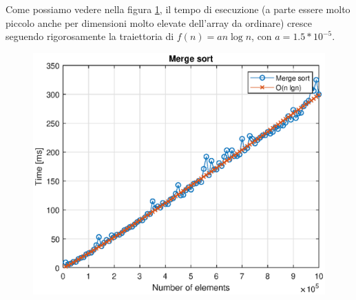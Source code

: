 Come possiamo vedere nella figura \ref{merge:fig}, il tempo di esecuzione (a parte essere molto piccolo anche per dimensioni molto elevate dell'array da ordinare) cresce seguendo rigorosamente la traiettoria di $f(n) = an\log n$, con $a = 1.5*10^{-5}$.

\begin{figure}[h]
	\includegraphics{merge/graph.eps}
	\label{merge:fig}
\end{figure}
